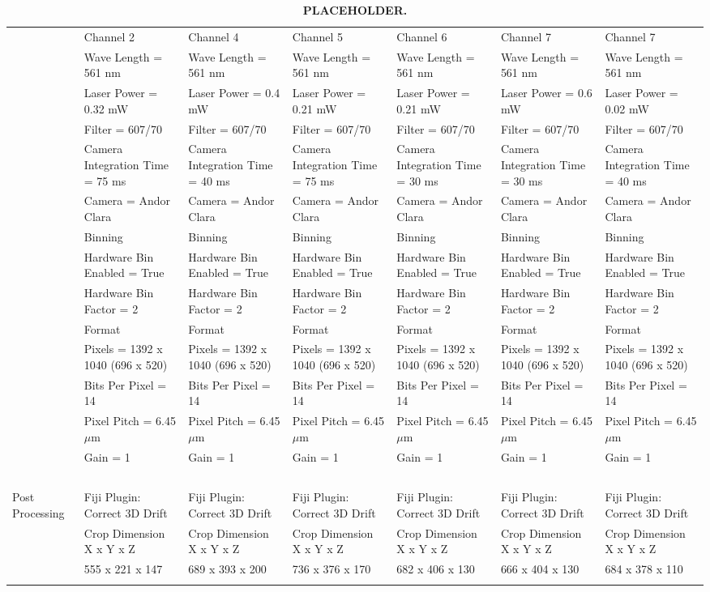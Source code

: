 \documentclass[11pt,a4paper, final]{article}
\begin{document}
\begin{longtable}{@{} l l l l l l l @{}}
& Channel 2 & Channel 4 & Channel 5 & Channel 6 & Channel 7 & Channel 7\\
& Wave Length = 561 nm & Wave Length = 561 nm & Wave Length = 561 nm & Wave Length = 561 nm & Wave Length = 561 nm & Wave Length = 561 nm\\
& Laser Power = 0.32 mW & Laser Power = 0.4 mW & Laser Power = 0.21 mW & Laser Power = 0.21 mW & Laser Power = 0.6 mW & Laser Power = 0.02 mW\\
& Filter = 607/70 & Filter = 607/70 & Filter = 607/70 & Filter = 607/70 & Filter = 607/70 & Filter = 607/70\\
& Camera Integration Time = 75 ms & Camera Integration Time = 40 ms & Camera Integration Time = 75 ms & Camera Integration Time = 30 ms & Camera Integration Time = 30 ms & Camera Integration Time = 40 ms\\
& Camera = Andor Clara & Camera = Andor Clara & Camera = Andor Clara & Camera = Andor Clara & Camera = Andor Clara & Camera = Andor Clara\\
& Binning & Binning & Binning & Binning & Binning & Binning\\
& Hardware Bin Enabled = True & Hardware Bin Enabled = True & Hardware Bin Enabled = True & Hardware Bin Enabled = True & Hardware Bin Enabled = True & Hardware Bin Enabled = True\\
& Hardware Bin Factor = 2 & Hardware Bin Factor = 2 & Hardware Bin Factor = 2 & Hardware Bin Factor = 2 & Hardware Bin Factor = 2 & Hardware Bin Factor = 2\\
& Format & Format & Format & Format & Format & Format\\
& Pixels = 1392 x 1040 (696 x 520) & Pixels = 1392 x 1040 (696 x 520) & Pixels = 1392 x 1040 (696 x 520) & Pixels = 1392 x 1040 (696 x 520) & Pixels = 1392 x 1040 (696 x 520) & Pixels = 1392 x 1040 (696 x 520)\\
& Bits Per Pixel = 14 & Bits Per Pixel = 14 & Bits Per Pixel = 14 & Bits Per Pixel = 14 & Bits Per Pixel = 14 & Bits Per Pixel = 14\\
& Pixel Pitch = 6.45 $\mu$m & Pixel Pitch = 6.45 $\mu$m & Pixel Pitch = 6.45 $\mu$m & Pixel Pitch = 6.45 $\mu$m & Pixel Pitch = 6.45 $\mu$m & Pixel Pitch = 6.45 $\mu$m\\
& Gain = 1 & Gain = 1 & Gain = 1 & Gain = 1 & Gain = 1 & Gain = 1\\
& \ & \ & \ & \ & \ & \ \\
Post Processing & Fiji Plugin: Correct 3D Drift & Fiji Plugin: Correct 3D Drift & Fiji Plugin: Correct 3D Drift & Fiji Plugin: Correct 3D Drift & Fiji Plugin: Correct 3D Drift & Fiji Plugin: Correct 3D Drift\\
& Crop Dimension X x Y x Z & Crop Dimension X x Y x Z & Crop Dimension X x Y x Z & Crop Dimension X x Y x Z & Crop Dimension X x Y x Z & Crop Dimension X x Y x Z\\
& 555 x 221 x 147 & 689 x 393 x 200 & 736 x 376 x 170 & 682 x 406 x 130 & 666 x 404 x 130 & 684 x 378 x 110\\
\bottomrule
\caption[XXXXX.]{\textbf{PLACEHOLDER.}
	}
\label{tab:metadata}
\end{longtable}
\end{document}
